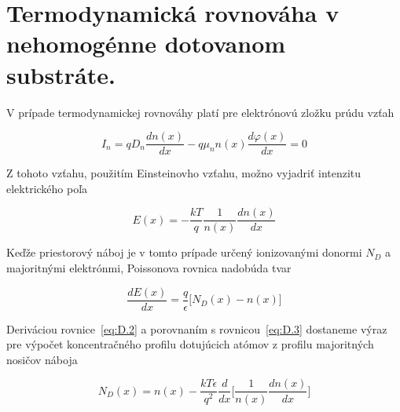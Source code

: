 
\chapter{Termodynamická rovnováha v nehomogénne dotovanom substráte.}\label{app:AppendixD}

V prípade termodynamickej rovnováhy platí pre elektrónovú zložku prúdu
vzťah

\begin{equation}\label{eq:D.1}
  I_n = qD_n\frac{dn(x)}{dx} - q\mu_{n}n(x) \frac{d\varphi(x)}{dx} = 0
\end{equation}

Z tohoto vzťahu, použitím Einsteinovho vzťahu, možno vyjadriť
intenzitu elektrického poľa

\begin{equation}\label{eq:D.2}
  E(x) = - \frac{kT}{q} \frac{1}{n(x)} \frac{dn(x)}{dx}
\end{equation}

Keďže priestorový náboj je v tomto prípade určený ionizovanými donormi
$N_D$ a majoritnými elektrónmi, Poissonova rovnica nadobúda tvar

\begin{equation}\label{eq:D.3}
  \frac{dE(x)}{dx} = \frac{q}{\epsilon} \big[N_D(x) - n(x)\big]
\end{equation}

Deriváciou rovnice~\ref{eq:D.2} a porovnaním s rovnicou~\ref{eq:D.3}
dostaneme výraz pre výpočet koncentračného profilu dotujúcich atómov z
profilu majoritných nosičov náboja

\begin{equation}\label{eq:D.4}
  N_D(x) = n(x) - \frac{kT\epsilon}{q^2} \frac{d}{dx} \bigg[\frac{1}{n(x)} \frac{dn(x)}{dx}\bigg]
\end{equation}

